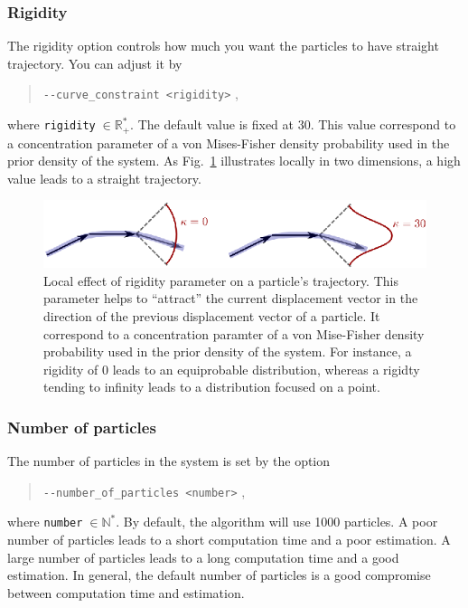     \subsubsection*{Rigidity}
        The rigidity option controls how much you want the particles to have straight trajectory. You can adjust it by
            \begin{quote}
                \texttt{-\hspace{0.1mm}-curve\_constraint <rigidity>} \enspace ,
            \end{quote}
        where \texttt{rigidity}$\;\in\mathbb{R}_+^*$. The default value is fixed at 30.
        This value correspond to a concentration parameter of a von Mises-Fisher density probability used in the prior density of the system. As Fig.~\ref{tracto-fig:concentration} illustrates locally in two dimensions, a high value leads to a straight trajectory.

        \begin{figure}
            \centering
            \includegraphics[height=0.1\textheight]{concentration}
            \caption{Local effect of rigidity parameter on a particle's trajectory. This parameter helps to ``attract'' the current displacement vector in the direction of the previous displacement vector of a particle. It correspond to a concentration paramter of a von Mise-Fisher density probability used in the prior density of the system. For instance, a rigidity of 0 leads to an equiprobable distribution, whereas a rigidty tending to infinity leads to a distribution focused on a point.}
            \label{tracto-fig:concentration}
        \end{figure}


    \subsubsection*{Number of particles}
        The number of particles in the system is set by the option
            \begin{quote}
                \texttt{-\hspace{0.1mm}-number\_of\_particles <number>} \enspace ,
            \end{quote}
        where \texttt{number}$\;\in\mathbb{N}^*$. By default, the algorithm will use 1000 particles.
        A poor number of particles leads to a short computation time and a poor estimation. A large number of particles leads to a long computation time and a good estimation. In general, the default number of particles is a good compromise between computation time and estimation.


